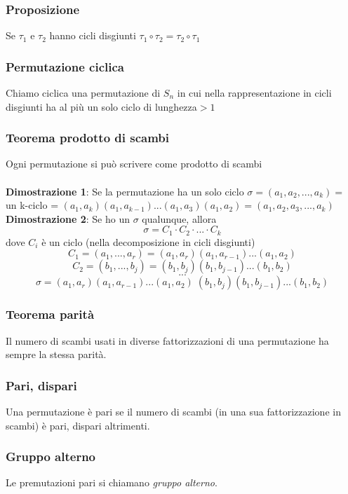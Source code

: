 \subsubsection{Proposizione}
Se \(\tau _1\) e \(\tau _2\) hanno cicli disgiunti \(\tau _1\circ\tau _2 = \tau _2\circ\tau _1\)

\subsubsection{Permutazione ciclica}
Chiamo ciclica una permutazione di $S_n$ in cui nella rappresentazione in cicli disgiunti ha al più un solo ciclo di lunghezza\(>1\)

\subsubsection{Teorema prodotto di scambi}
Ogni permutazione si può scrivere come prodotto di scambi
\\\\
\textbf{Dimostrazione 1}: Se la permutazione ha un solo ciclo \(\sigma =(a_1, a_2, ... , a_k)=\) un k-ciclo = \((a_1,a_k)(a_1,a_{k-1})...(a_1,a_3)(a_1,a_2)=(a_1,a_2,a_3,...,a_k)\)
\\
\textbf{Dimostrazione 2}: Se ho un \(\sigma\) qualunque, allora
\[\sigma=C_1\cdot C_2\cdot ... \cdot C_k\]
dove \(C_i\) è un ciclo (nella decomposizione in cicli disgiunti)
\[C_1=(a_1,...,a_r)=(a_1,a_r)(a_1,a_{r-1})...(a_1,a_2)\]
\[C_2=(b_1,...,b_j)=(b_1,b_j)(b_1,b_{j-1})...(b_1,b_2)\]
\[. . .\]
\[\sigma =(a_1,a_r)(a_1,a_{r-1})...(a_1,a_2)\;(b_1,b_j)(b_1,b_{j-1})...(b_1,b_2) \]

\subsubsection{Teorema parità}
Il numero di scambi usati in diverse fattorizzazioni di una permutazione ha sempre la stessa parità.

\subsubsection{Pari, dispari}
Una permutazione è pari se il numero di scambi (in una sua fattorizzazione in scambi) è pari, dispari altrimenti.

\subsubsection{Gruppo alterno}

Le premutazioni pari si chiamano \textit{gruppo alterno}.


